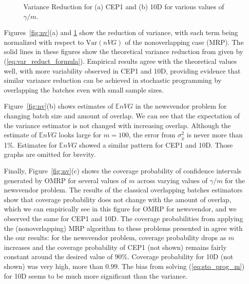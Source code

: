 \documentclass{article}
\newcommand{\e}[1]{\mathbb{E} %
#1 %
}
\newcommand{\var}[1]{\mathrm{Var} \left( #1 \right)}
\newcommand{\x}{x} %
\newcommand{\xh}{{\hat{\x}}}
\begin{document}
\begin{figure}[htb!]
	\centering
		\caption{
		Variance Reduction for
		(a) CEP1 and 
		(b) 10D
		for various values of $\gamma / m$.
		}
\label{fig:varvar}
\end{figure}


Figures~\ref{fig:nv}(a) and \ref{fig:varvar} show the reduction of variance, with each term being normalized with respect to $\var{nVG}$ of the nonoverlapping case (MRP). 
The solid lines in these figures show the theoretical variance reduction from \cite{Welch1987} given by (\ref{eq:var_reduct_formula}). 
Empirical results agree with the theoretical values well, with more variability observed in CEP1 and 10D, providing evidence that similar variance reduction can be achieved in stochastic programming by overlapping the batches even with small sample sizes. 

Figure~\ref{fig:nv}(b) shows estimates of $\e{nVG}$ in the newsvendor problem for changing batch size and amount of overlap. 
We can see that the expectation of the variance estimator is not changed with increasing overlap. 
Although the estimate of $\e{nVG}$ looks large for $m=100$, the error from $\sigma^2_\xh$ is never more than 1\%.  
Estimates for $\e{nVG}$ showed a similar pattern for CEP1 and 10D.  Those graphs are omitted for brevity.

Finally, Figure~\ref{fig:nv}(c) shows the coverage probability of confidence intervals generated by OMRP for several values of $m$ across varying values of $\gamma/m$ for the newsvendor problem.  
The results of the classical overlapping batches estimators show that coverage probability does not change with the amount of overlap, which we can  empirically see in this figure for OMRP for newsvendor, and we observed the same for CEP1 and 10D.  
The coverage probabilities from applying the (nonoverlapping) MRP algorithm to these problems presented in \cite{Bayraksan2006} agree with the our results: for the newsvendor problem, coverage probability drops as $m$ increases and the coverage probability of CEP1 (not shown) remains fairly constant around the desired value of $90\%$. 
Coverage probability for 10D (not shown) was very high, more than $0.99$.  The bias from solving (\ref{eq:sto_prog_m}) for 10D seems to be much more significant than the variance.
\end{document}
